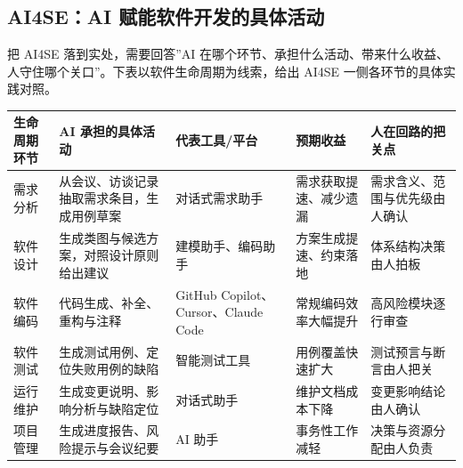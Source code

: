 \documentclass[12pt,a4paper,twoside,openany]{ctexbook}
\numberwithin{figure}{chapter}
\numberwithin{table}{chapter}
\newcounter{none}
\begin{document}
\subsection{AI4SE：AI
赋能软件开发的具体活动}\label{ai4seai-ux8d4bux80fdux8f6fux4ef6ux5f00ux53d1ux7684ux5177ux4f53ux6d3bux52a8}

把 AI4SE 落到实处，需要回答''AI
在哪个环节、承担什么活动、带来什么收益、人守住哪个关口''。下表以软件生命周期为线索，给出
AI4SE 一侧各环节的具体实践对照。

{\def\LTcaptype{none} %
\begin{longtable}[]{@{}
  >{\raggedright\arraybackslash}p{}
  >{\raggedright\arraybackslash}p{}
  >{\raggedright\arraybackslash}p{}
  >{\raggedright\arraybackslash}p{}
  >{\raggedright\arraybackslash}p{}@{}}
\toprule\noalign{}
\begin{minipage}[b]{\linewidth}\raggedright
生命周期环节
\end{minipage} & \begin{minipage}[b]{\linewidth}\raggedright
AI 承担的具体活动
\end{minipage} & \begin{minipage}[b]{\linewidth}\raggedright
代表工具/平台
\end{minipage} & \begin{minipage}[b]{\linewidth}\raggedright
预期收益
\end{minipage} & \begin{minipage}[b]{\linewidth}\raggedright
人在回路的把关点
\end{minipage} \\
\midrule\noalign{}
\endhead
\bottomrule\noalign{}
\endlastfoot
需求分析 & 从会议、访谈记录抽取需求条目，生成用例草案 & 对话式需求助手 &
需求获取提速、减少遗漏 & 需求含义、范围与优先级由人确认 \\
软件设计 & 生成类图与候选方案，对照设计原则给出建议 & 建模助手、编码助手
& 方案生成提速、约束落地 & 体系结构决策由人拍板 \\
软件编码 & 代码生成、补全、重构与注释 & GitHub Copilot、Cursor、Claude
Code & 常规编码效率大幅提升 & 高风险模块逐行审查 \\
软件测试 & 生成测试用例、定位失败用例的缺陷 & 智能测试工具 &
用例覆盖快速扩大 & 测试预言与断言由人把关 \\
运行维护 & 生成变更说明、影响分析与缺陷定位 & 对话式助手 &
维护文档成本下降 & 变更影响结论由人确认 \\
项目管理 & 生成进度报告、风险提示与会议纪要 & AI 助手 & 事务性工作减轻 &
决策与资源分配由人负责 \\
\end{longtable}
}
\end{document}
